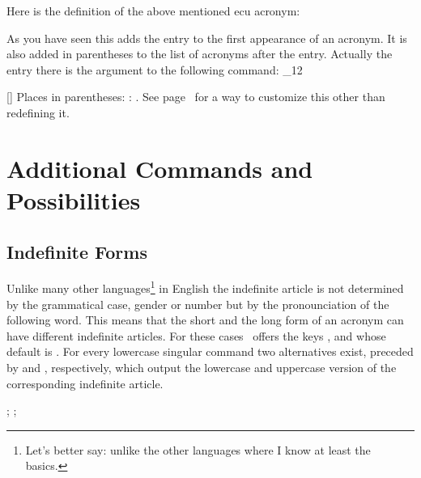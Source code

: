 \documentclass[load-preamble+]{cnltx-doc}
\makeatletter
\renewenvironment{commands}
  {%
    \cnltx@set@catcode_{12}%
    \let\command\cnltx@command
    \cnltxlist
  }
  {\endcnltxlist}
\makeatother
\begin{document}
Here is the definition of the above mentioned \ac{ecu} acronym:
\begin{sourcecode}
\end{sourcecode}
As you have seen this adds the  entry to the first appearance
of an acronym.  It is also added in parentheses to the list of acronyms after
the  entry.  Actually the entry there is the argument to the
following command:
\begin{commands}
  \command{acroenparen}[]
    Places  in parentheses: :
    .  See page~\pageref{key:list-foreign-format} for a
    way to customize this other than redefining it.
\end{commands}

\section{Additional Commands and Possibilities}
\subsection{Indefinite Forms}

Unlike many other languages\footnote{Let's better say: unlike the other
  languages where I know at least the basics.} in English the indefinite
article is not determined by the grammatical case, gender or number but by the
pronounciation of the following word.  This means that the short and the long
form of an acronym can have different indefinite articles.  For these cases
\acro\ offers the keys ,  and
 whose default is .  For every lowercase
singular command two alternatives exist, preceded by  and ,
respectively, which output the lowercase and uppercase version of the
corresponding indefinite article.

\begin{example}
  ; ; 
\end{example}
\end{document}
